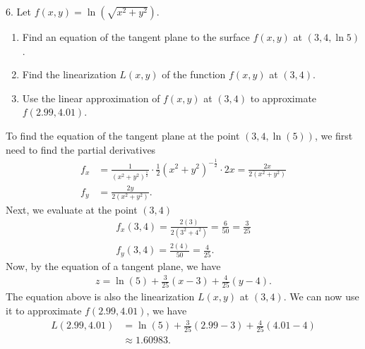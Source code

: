 \documentclass{report}
\begin{document}
    \bigbreak \noindent 
    \begin{mdframed}
        6. Let $f(x, y)=\ln \left(\sqrt{x^2+y^2}\right)$.
        \begin{enumerate}[label=(\alph*)]
            \item Find an equation of the tangent plane to the surface $f(x, y)$ at $(3,4, \ln 5)$.
            \item Find the linearization $L(x, y)$ of the function $f(x, y)$ at $(3,4)$.
            \item Use the linear approximation of $f(x, y)$ at $(3,4)$ to approximate $f(2.99,4.01)$.
        \end{enumerate}
    \end{mdframed}
    \bigbreak \noindent 
    To find the equation of the tangent plane at the point $(3,4,\ln{(5)})$, we first need to find the partial derivatives
    \begin{align*}
        f_{x} &= \frac{1}{(x^{2}+y^{2})^{\frac{1}{2}}} \cdot \frac{1}{2}(x^{2}+y^{2})^{-\frac{1}{2}}\cdot 2x = \frac{2x}{2(x^{2}+y^{2})} \\
        f_{y}&=\frac{2y}{2(x^{2}+y^{2})}
    .\end{align*}
    \bigbreak \noindent 
    Next, we evaluate at the point $(3,4)$
    \begin{align*}
        f_{x}(3,4) = \frac{2(3)}{2(3^{2}+4^{2})} = \frac{6}{50} = \frac{3}{25} \\
        f_{y}(3,4) = \frac{2(4)}{50} = \frac{4}{25}
    .\end{align*}
    \bigbreak \noindent 
    Now, by the equation of a tangent plane, we have
    \begin{align*}
        z = \ln{(5)} + \frac{3}{25}(x-3)+\frac{4}{25}(y-4)
    .\end{align*}
    \bigbreak \noindent 
    The equation above is also the linearization $L(x,y)$ at $(3,4)$. We can now use it to approximate $f(2.99,4.01)$, we have
    \begin{align*}
        L(2.99,4.01) &= \ln{(5)} + \frac{3}{25}(2.99-3) + \frac{4}{25}(4.01-4) \\
        &\approx 1.60983
    .\end{align*}
\end{document}
